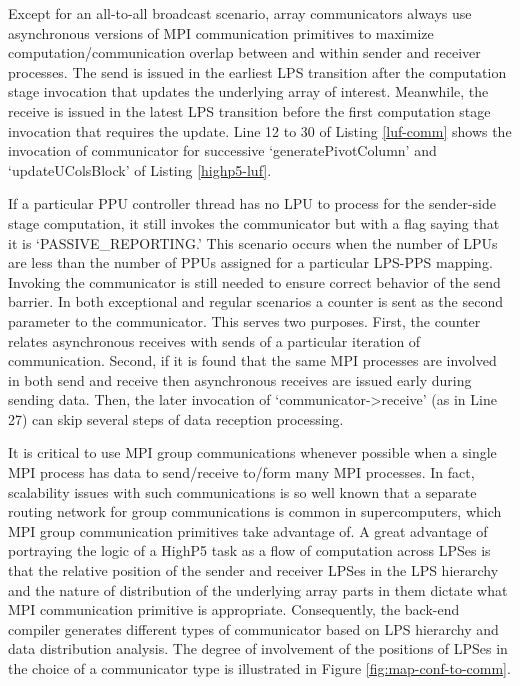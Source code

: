 \documentclass[ASNA,twocolumn]{USG} %
\begin{document}
{Except for an all-to-all broadcast scenario, array communicators always use asynchronous versions of MPI communication primitives to maximize computation/communication overlap between and within sender and receiver processes. The send is issued in the earliest LPS transition after the computation stage invocation that updates the underlying array of interest. Meanwhile, the receive is issued in the latest LPS transition before the first computation stage invocation that requires the update. Line 12 to 30 of Listing \ref{luf-comm} shows the invocation of communicator for successive `generatePivotColumn' and `updateUColsBlock' of Listing \ref{highp5-luf}.  

If a particular PPU controller thread has no LPU to process for the sender-side stage computation, it still invokes the communicator but with a flag saying that it is `PASSIVE\_REPORTING.' This scenario occurs when the number of LPUs are less than the number of PPUs assigned for a particular LPS-PPS mapping. Invoking the communicator is still needed to ensure correct behavior of the send barrier. In both exceptional and regular scenarios a counter is sent as the second parameter to the communicator. This serves two purposes. First, the counter relates asynchronous receives with sends of a particular iteration of communication. Second, if it is found that the same MPI processes are involved in both send and receive then asynchronous receives are issued early during sending data. Then, the later invocation of `communicator->receive' (as in Line 27) can skip several steps of data reception processing. 

It is critical to use MPI group communications whenever possible when a single MPI process has data to send/receive to/form many MPI processes. In fact, scalability issues with such communications is so well known \citep{6312198} that a separate routing network for group communications is common in supercomputers, which MPI group communication primitives take advantage of. A great advantage of portraying the logic of a HighP5 task as a flow of computation across LPSes is that the relative position of the sender and receiver LPSes in the LPS hierarchy and the nature of distribution of the underlying array parts in them dictate what MPI communication primitive is appropriate. Consequently, the back-end compiler generates different types of communicator based on LPS hierarchy and data distribution analysis. The degree of involvement of the positions of LPSes in the choice of a communicator type is illustrated in Figure \ref{fig:map-conf-to-comm}. 

}
\end{document}
